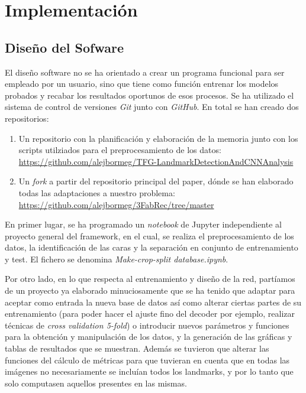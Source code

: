 \chapter{Implementación}

\section{Diseño del Sofware}

\noindent El diseño software no se ha orientado a crear un programa funcional para ser empleado por un usuario, sino que tiene como función entrenar los modelos probados y recabar los resultados oportunos de esos procesos. Se ha utilizado el sistema de control de versiones \textit{Git} junto con \textit{GitHub}. En total se han creado dos repositorios:

\begin{enumerate}
    \item Un repositorio con la planificación y elaboración de la memoria junto con los scripts utilziados para el preprocesamiento de los datos: \url{https://github.com/alejbormeg/TFG-LandmarkDetectionAndCNNAnalysis}
    \item Un \textit{fork} a partir del repositorio principal del paper, dónde se han elaborado todas las adaptaciones a nuestro problema: \url{https://github.com/alejbormeg/3FabRec/tree/master}
\end{enumerate}

\medskip

\noindent En primer lugar, se ha programado un \textit{notebook} de Jupyter independiente al proyecto general del framework, en el cual, se realiza el preprocesamiento de los datos, la identificación de las caras y la separación en conjunto de entrenamiento y test. El fichero se denomina \textit{Make-crop-split database.ipynb}.

\medskip

\noindent Por otro lado, en lo que respecta al entrenamiento y diseño de la red, partíamos de un proyecto ya elaborado minuciosamente que se ha tenido que adaptar para aceptar como entrada la nueva base de datos así como alterar ciertas partes de su entrenamiento (para poder hacer el ajuste fino del decoder por ejemplo, realizar técnicas de \textit{cross validation 5-fold}) o introducir nuevos parámetros y funciones para la obtención y manipulación de los datos, y la generación de las gráficas y tablas de resultados que se muestran. Además se tuvieron que alterar las funciones del cálculo de métricas para que tuvieran en cuenta que en todas las imágenes no necesariamente se incluían todos los landmarks, y por lo tanto que solo computasen aquellos presentes en las mismas.

